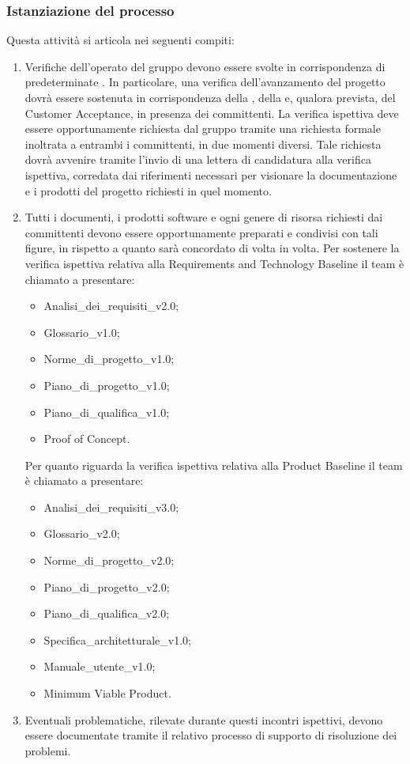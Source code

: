 \subsubsection{Istanziazione del processo}
Questa attività si articola nei seguenti compiti:
\begin{enumerate}
    \item Verifiche dell'operato del gruppo devono essere svolte in corrispondenza di predeterminate . In particolare, una verifica dell'avanzamento del progetto dovrà essere sostenuta in corrispondenza della , della  e, qualora prevista, del Customer Acceptance, in presenza dei committenti. La verifica ispettiva deve essere opportunamente richiesta dal gruppo tramite una richiesta formale inoltrata a entrambi i committenti, in due momenti diversi. Tale richiesta dovrà avvenire tramite l'invio di una lettera di candidatura alla verifica ispettiva, corredata dai riferimenti necessari per visionare la documentazione e i prodotti del progetto richiesti in quel momento.
    \item Tutti i documenti, i prodotti software e ogni genere di risorsa richiesti dai committenti devono essere opportunamente preparati e condivisi con tali figure, in rispetto a quanto sarà concordato di volta in volta. Per sostenere la verifica ispettiva relativa alla Requirements and Technology Baseline il team è chiamato a presentare:
    \begin{itemize}
        \item Analisi\_dei\_requisiti\_v2.0;
        \item Glossario\_v1.0;
        \item Norme\_di\_progetto\_v1.0;
        \item Piano\_di\_progetto\_v1.0;
        \item Piano\_di\_qualifica\_v1.0;
        \item Proof of Concept.
    \end{itemize}
    Per quanto riguarda la verifica ispettiva relativa alla Product Baseline il team è chiamato a presentare:
    \begin{itemize}
        \item Analisi\_dei\_requisiti\_v3.0;
        \item Glossario\_v2.0;
        \item Norme\_di\_progetto\_v2.0;
        \item Piano\_di\_progetto\_v2.0;
        \item Piano\_di\_qualifica\_v2.0;
        \item Specifica\_architetturale\_v1.0;
        \item Manuale\_utente\_v1.0;
        \item Minimum Viable Product.
    \end{itemize}
    \item Eventuali problematiche, rilevate durante questi incontri ispettivi, devono essere documentate tramite il relativo processo di supporto di risoluzione dei problemi.
\end{enumerate}
